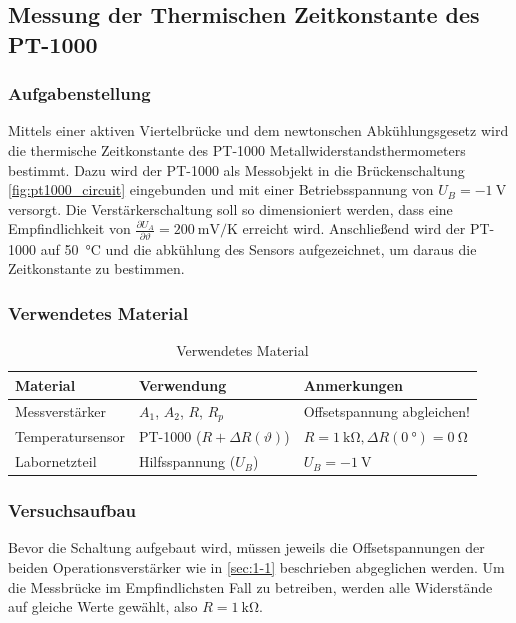 \newpage

\subsection{Messung der Thermischen Zeitkonstante des PT-1000}
\subsubsection{Aufgabenstellung}

Mittels einer aktiven Viertelbrücke und dem newtonschen Abkühlungsgesetz
\cite[S.~79, Gl.~3.30]{EMTPraktikum2025} wird die thermische Zeitkonstante des
PT-1000 Metallwiderstandsthermometers bestimmt. Dazu wird der PT-1000
als Messobjekt in die Brückenschaltung \autoref{fig:pt1000_circuit} eingebunden
und mit einer Betriebsspannung von $U_B = \SI{-1}{\volt}$ versorgt. Die
Verstärkerschaltung soll so dimensioniert werden, dass eine Empfindlichkeit von
$\frac{\partial U_A}{\partial \vartheta} = \SI{200}{\milli\volt\per\kelvin}$
erreicht wird. Anschließend wird der PT-1000 auf \SI{50}{\degreeCelsius} und die abkühlung des Sensors aufgezeichnet, um daraus die Zeitkonstante zu bestimmen.

\subsubsection{Verwendetes Material}

\begin{table}[h]
	\centering
	\caption{Verwendetes Material}
	\begin{tabularx}{\textwidth}{XXX}
		\textbf{Material} & \textbf{Verwendung} & \textbf{Anmerkungen} \\ \midrule
		Messverstärker & $A_1$, $A_2$, $R$, $R_p$ & Offsetspannung abgleichen! \\
		Temperatursensor & PT-1000 ($R + \Delta R(\vartheta)$) & $R=\SI{1}{\kilo\ohm}, \Delta R(\SI{0}{\degree}) = \SI{0}{\ohm}$ \\
		Labornetzteil & Hilfsspannung ($U_B$) & $U_B = \SI{-1}{\volt}$ \\
	\end{tabularx}	
\end{table}
\subsubsection{Versuchsaufbau}

Bevor die Schaltung aufgebaut wird, müssen jeweils die Offsetspannungen der
beiden Operationsverstärker wie in \autoref{sec:1-1} beschrieben abgeglichen
werden. Um die Messbrücke im Empfindlichsten Fall zu betreiben, werden alle Widerstände
auf gleiche Werte gewählt, also $R = \SI{1}{\kilo\ohm}$.

